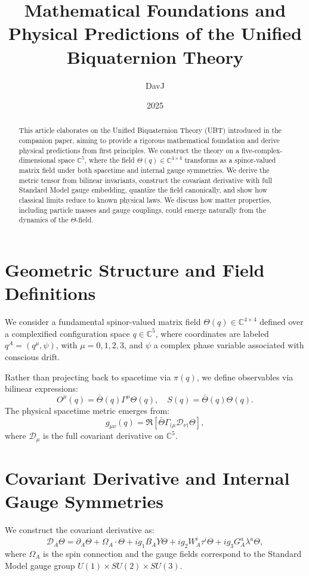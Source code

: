 \documentclass[12pt]{article}
\title{Mathematical Foundations and Physical Predictions of the Unified Biquaternion Theory}
\author{DavJ}
\date{2025}
\begin{document}
\maketitle

\begin{abstract}
This article elaborates on the Unified Biquaternion Theory (UBT) introduced in the companion paper, aiming to provide a rigorous mathematical foundation and derive physical predictions from first principles. We construct the theory on a five-complex-dimensional space \( \mathbb{C}^5 \), where the field \( \Theta(q) \in \mathbb{C}^{4 \times 4} \) transforms as a spinor-valued matrix field under both spacetime and internal gauge symmetries. We derive the metric tensor from bilinear invariants, construct the covariant derivative with full Standard Model gauge embedding, quantize the field canonically, and show how classical limits reduce to known physical laws. We discuss how matter properties, including particle masses and gauge couplings, could emerge naturally from the dynamics of the \( \Theta \)-field.
\end{abstract}

\section{Geometric Structure and Field Definitions}
We consider a fundamental spinor-valued matrix field \( \Theta(q) \in \mathbb{C}^{4 \times 4} \) defined over a complexified configuration space \( q \in \mathbb{C}^5 \), where coordinates are labeled \( q^A = (q^\mu, \psi) \), with \( \mu=0,1,2,3 \), and \( \psi \) a complex phase variable associated with conscious drift.

Rather than projecting back to spacetime via \( \pi(q) \), we define observables via bilinear expressions:
\[ O^\mu(q) = \bar{\Theta}(q) \Gamma^\mu \Theta(q), \quad S(q) = \bar{\Theta}(q) \Theta(q). \]
The physical spacetime metric emerges from:
\[ g_{\mu\nu}(q) = \Re\left[ \bar{\Theta} \Gamma_{(\mu} \mathcal{D}_{\nu)} \Theta \right], \]
where \( \mathcal{D}_\mu \) is the full covariant derivative on \( \mathbb{C}^5 \).

\section{Covariant Derivative and Internal Gauge Symmetries}
We construct the covariant derivative as:
\[
\mathcal{D}_A \Theta = \partial_A \Theta + \Omega_A \cdot \Theta + i g_1 B_A Y \Theta + i g_2 W_A^i \tau^i \Theta + i g_3 G_A^a \lambda^a \Theta,
\]
where \( \Omega_A \) is the spin connection and the gauge fields correspond to the Standard Model gauge group \( U(1) \times SU(2) \times SU(3) \).
\end{document}
